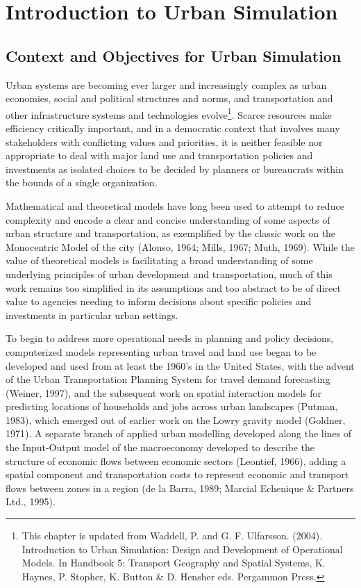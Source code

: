 
\chapter{Introduction to Urban Simulation}

\section{Context and Objectives for Urban Simulation}
Urban systems are becoming ever larger and increasingly complex as urban economies,
social and political structures and norms, and transportation and other infrastructure
systems and technologies evolve\footnote{This chapter is updated from
Waddell, P. and G. F. Ulfarsson. (2004).  Introduction to Urban Simulation: Design and Development of Operational Models.
In Handbook 5: Transport Geography and Spatial Systems, K. Haynes, P. Stopher, K. Button \& D. Hensher eds.  Pergammon Press.}.
Scarce resources make efficiency critically important,
and in a democratic context that involves many stakeholders with conflicting values and
priorities, it is neither feasible nor appropriate to deal with major land use and transportation
policies and investments as isolated choices to be decided by planners or bureaucrats within
the bounds of a single organization.

Mathematical and theoretical models have long been used to attempt to reduce complexity and encode a clear and concise understanding of some aspects of urban structure and transportation, as exemplified by the classic work on the Monocentric Model of the city (Alonso, 1964; Mills, 1967; Muth, 1969).  While the value of theoretical models is facilitating a broad understanding of some underlying principles of urban development and transportation, much of this work remains too simplified in its assumptions and too abstract to be of direct value to agencies needing to inform decisions about specific policies and investments in particular urban settings.

To begin to address more operational needs in planning and policy decisions, computerized models representing urban travel and land use began to be developed and used from at least the 1960's in the United States, with the advent of the Urban Transportation Planning System for travel demand forecasting (Weiner, 1997), and the subsequent work on spatial interaction models for predicting locations of households and jobs across urban landscapes (Putman, 1983), which emerged out of earlier work on the Lowry gravity model (Goldner, 1971).  A separate branch of applied urban modelling developed along the lines of the Input-Output model of the macroeconomy developed to describe the structure of economic flows between economic sectors (Leontief, 1966), adding a spatial component and transportation costs to represent economic and transport flows between zones in a region (de la Barra, 1989; Marcial Echenique \& Partners Ltd., 1995).

